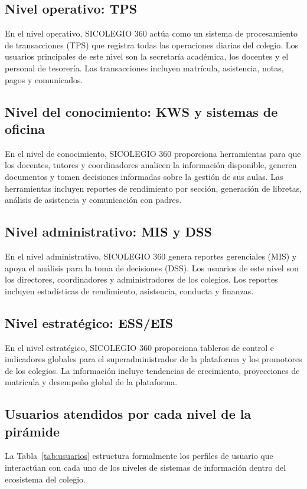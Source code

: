 \documentclass[12pt,a4paper,oneside]{report}
\begin{document}
\subsection{Nivel operativo: TPS}
En el nivel operativo, SICOLEGIO 360 actúa como un sistema de procesamiento de transacciones (TPS) que registra todas las operaciones diarias del colegio. Los usuarios principales de este nivel son la secretaría académica, los docentes y el personal de tesorería. Las transacciones incluyen matrícula, asistencia, notas, pagos y comunicados.

\subsection{Nivel del conocimiento: KWS y sistemas de oficina}
En el nivel de conocimiento, SICOLEGIO 360 proporciona herramientas para que los docentes, tutores y coordinadores analicen la información disponible, generen documentos y tomen decisiones informadas sobre la gestión de sus aulas. Las herramientas incluyen reportes de rendimiento por sección, generación de libretas, análisis de asistencia y comunicación con padres.

\subsection{Nivel administrativo: MIS y DSS}
En el nivel administrativo, SICOLEGIO 360 genera reportes gerenciales (MIS) y apoya el análisis para la toma de decisiones (DSS). Los usuarios de este nivel son los directores, coordinadores y administradores de los colegios. Los reportes incluyen estadísticas de rendimiento, asistencia, conducta y finanzas.

\subsection{Nivel estratégico: ESS/EIS}
En el nivel estratégico, SICOLEGIO 360 proporciona tableros de control e indicadores globales para el superadministrador de la plataforma y los promotores de los colegios. La información incluye tendencias de crecimiento, proyecciones de matrícula y desempeño global de la plataforma.

\subsection{Usuarios atendidos por cada nivel de la pirámide}
La Tabla~\ref{tab:usuarios} estructura formalmente los perfiles de usuario que interactúan con cada uno de los niveles de sistemas de información dentro del ecosistema del colegio.
\end{document}
